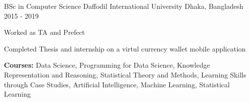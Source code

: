 

\begin{cventries}

  \cventry
    {BSc in Computer Science} %
    {Daffodil International University} %
    {Dhaka, Bangladesh} %
    {2015 - 2019} %
    {
      \begin{cvitems} %
        \item {Worked as TA and Prefect}
        \item {Completed Thesis and internship on a virtul currency wallet mobile application}
        \item {\textbf{Courses:} Data Science, Programming for Data Science, Knowledge Representation and Reasoning, Statistical Theory and Methods, Learning Skills through Case Studies, Artificial Intelligence, Machine Learning, Statistical Learning}
      \end{cvitems}
    }

\end{cventries}
